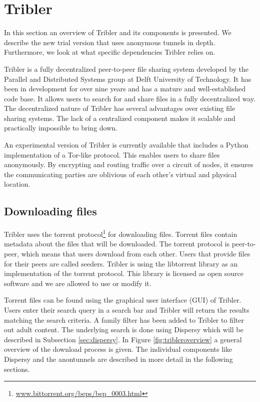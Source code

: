 
\section{Tribler}
	\label{sec:tribler}
	In this section an overview of Tribler and its components is presented. We describe the new trial version that uses anonymous tunnels in depth. Furthermore, we look at what specific dependencies Tribler relies on.

	Tribler is a fully decentralized peer-to-peer file sharing system developed by the Parallel and Distributed Systems group at Delft University of Technology. It has been in development for over nine years and has a mature and well-established code base. It allows users to search for and share files in a fully decentralized way. The decentralized nature of Tribler has several advantages over existing file sharing systems. The lack of a centralized component makes it scalable and practically impossible to bring down. 

	An experimental version of Tribler is currently available that includes a Python implementation of a Tor-like protocol. This enables users to share files anonymously. By encrypting and routing traffic over a circuit of nodes, it ensures the communicating parties are oblivious of each other's virtual and physical location.
	
	\subsection{Downloading files}
		Tribler uses the torrent protocol\footnote{\href{http://www.bittorrent.org/beps/bep\_0003.html}{www.bittorrent.org/beps/bep\_0003.html}} for downloading files. Torrent files contain metadata about the files that will be downloaded. The torrent protocol is peer-to-peer, which means that users download from each other. Users that provide files for their peers are called seeders. Tribler is using the libtorrent library as an implementation of the torrent protocol. This library is licensed as open source software and we are allowed to use or modify it.
		
		Torrent files can be found using the graphical user interface (GUI) of Tribler. Users enter their search query in a search bar and Tribler will return the results matching the search criteria. A family filter has been added to Tribler to filter out adult content. The underlying search is done using Dispersy which will be described in Subsection \ref{sec:dispersy}. In Figure \ref{fig:tribleroverview} a general overview of the download process is given. The individual components like Dispersy and the anontunnels are described in more detail in the following sections.
		
